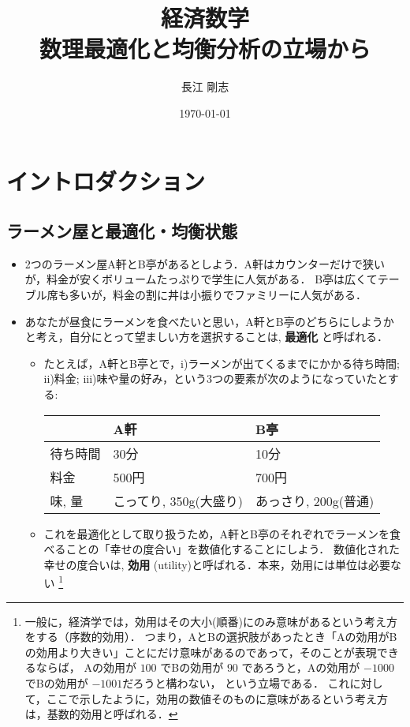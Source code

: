 \documentclass[platex,12pt,a4paper]{jsarticle}
\author{長江 剛志}
\date{\today}
\title{経済数学\\\medskip
\large 数理最適化と均衡分析の立場から}
\begin{document}
\maketitle
\tableofcontents

\section{イントロダクション}
\label{sec:orgc39de6a}
\subsection{ラーメン屋と最適化・均衡状態}
\label{sec:orgdd40eac}
\begin{itemize}
\item 2つのラーメン屋A軒とB亭があるとしよう．A軒はカウンターだけで狭いが，料金が安くボリュームたっぷりで学生に人気がある．
B亭は広くてテーブル席も多いが，料金の割に丼は小振りでファミリーに人気がある．
\item あなたが昼食にラーメンを食べたいと思い，A軒とB亭のどちらにしようかと考え，自分にとって望ましい方を選択することは, \textbf{\textbf{最適化}} と呼ばれる．
\begin{itemize}
\item たとえば，A軒とB亭とで，i)ラーメンが出てくるまでにかかる待ち時間; ii)料金; iii)味や量の好み，という3つの要素が次のようになっていたとする:
\begin{center}
\begin{tabular}{lll}
\hline
 & A軒 & B亭\\
\hline
待ち時間 & 30分 & 10分\\
料金 & 500円 & 700円\\
味, 量 & こってり, 350g(大盛り) & あっさり, 200g(普通)\\
\hline
\end{tabular}
\end{center}
\item これを最適化として取り扱うため，A軒とB亭のそれぞれでラーメンを食べることの「幸せの度合い」を数値化することにしよう．
数値化された幸せの度合いは, \textbf{\textbf{効用}} (utility)と呼ばれる．本来，効用には単位は必要ない
\footnote{
一般に，経済学では，効用はその大小(順番)にのみ意味があるという考え方をする（序数的効用）．
つまり，AとBの選択肢があったとき「Aの効用がBの効用より大きい」ことにだけ意味があるのであって，そのことが表現できるならば，
Aの効用が \(100\) でBの効用が \(90\) であろうと，Aの効用が \(-1000\) でBの効用が \(-1001\)だろうと構わない，
という立場である．
これに対して，ここで示したように，効用の数値そのものに意味があるという考え方は，基数的効用と呼ばれる．
}
\end{itemize}
\end{itemize}
\end{document}
